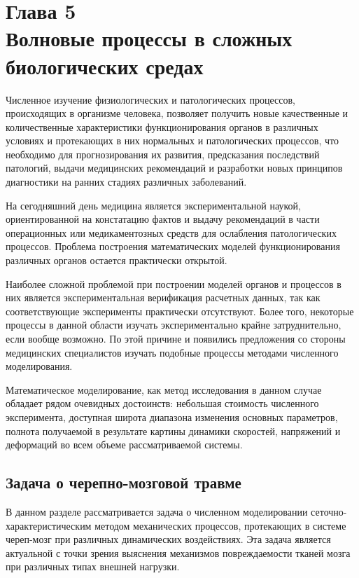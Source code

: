 \section*{Глава 5\\Волновые процессы в сложных биологических средах}
\setcounter{section}{5}
\setcounter{subsection}{0}

Численное изучение физиологических и патологических процессов, происходящих в организме человека, позволяет получить новые качественные и количественные характеристики функционирования органов в различных условиях и протекающих в них нормальных и патологических процессов, что необходимо для прогнозирования их развития, предсказания последствий патологий, выдачи медицинских рекомендаций и разработки новых принципов диагностики на ранних стадиях различных заболеваний.

На сегодняшний день медицина является экспериментальной наукой, ориентированной на констатацию фактов и выдачу рекомендаций в части операционных или медикаментозных средств для ослабления патологических процессов. Проблема построения математических моделей функционирования различных органов остается практически открытой.

Наиболее сложной проблемой при построении моделей органов и процессов в них является экспериментальная верификация расчетных данных, так как соответствующие эксперименты практически отсутствуют. Более того, некоторые процессы в данной области изучать экспериментально крайне затруднительно, если вообще возможно. По этой причине и появились предложения со стороны медицинских специалистов изучать подобные процессы методами численного моделирования.

Математическое моделирование, как метод исследования в данном случае обладает рядом очевидных достоинств: небольшая стоимость численного эксперимента, доступная широта диапазона изменения основных параметров, полнота получаемой в результате картины динамики скоростей, напряжений и деформаций во всем объеме рассматриваемой системы.

\clearpage
\newpage

\subsection{Задача о черепно-мозговой травме}

В данном разделе рассматривается задача о численном моделировании сеточно-характеристическим методом механических процессов, протекающих в системе череп-мозг при различных динамических воздействиях. Эта задача является актуальной с точки зрения выяснения механизмов повреждаемости тканей мозга при различных типах внешней нагрузки.

